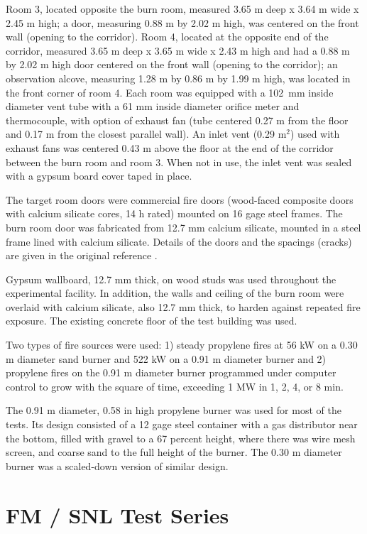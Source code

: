 Room 3, located opposite the burn room, measured 3.65 m deep x 3.64 m wide x 2.45 m high; a door, measuring 0.88 m by 2.02 m high, was centered on the front wall (opening to the corridor). Room 4, located at the opposite end of the corridor, measured 3.65 m deep x 3.65 m wide x 2.43 m high and had a 0.88 m by 2.02 m high door centered on the front wall (opening to the corridor); an observation alcove, measuring 1.28 m by 0.86 m by 1.99 m high, was located in the front corner of room 4. Each room was equipped with a 102~mm inside diameter vent tube with a 61 mm inside diameter orifice meter and thermocouple, with option of exhaust fan (tube centered 0.27 m from the floor and 0.17 m from the closest parallel wall). An inlet vent (0.29 m$^2$) used with exhaust fans was centered 0.43 m above the floor at the end of the corridor between the burn room and room 3. When not in use, the inlet vent was sealed with a gypsum board cover taped in place.

The target room doors were commercial fire doors (wood-faced composite doors with calcium silicate cores, 14 h rated) mounted on 16 gage steel frames. The burn room door was fabricated from 12.7 mm calcium silicate, mounted in a steel frame lined with calcium silicate. Details of the doors and the spacings (cracks) are given in the original reference \cite{Heskestad:1986}.

Gypsum wallboard, 12.7 mm thick, on wood studs was used throughout the experimental facility. In addition, the walls and ceiling of the burn room were overlaid with calcium silicate, also 12.7 mm thick, to harden against repeated fire exposure. The existing concrete floor of the test building was used.

Two types of fire sources were used: 1) steady propylene fires at 56 kW on a 0.30 m diameter sand burner and 522 kW on a 0.91 m diameter burner and 2) propylene fires on the 0.91 m diameter burner programmed under computer control to grow with the square of time, exceeding 1 MW in 1, 2, 4, or 8 min.

The 0.91 m diameter, 0.58 in high propylene burner was used for most of the tests. Its design consisted of a 12 gage steel container with a gas distributor near the bottom, filled with gravel to a 67 percent height, where there was wire mesh screen, and coarse sand to the full height of the burner. The 0.30 m diameter burner was a scaled-down version of similar design.

\section{FM / SNL Test Series}

